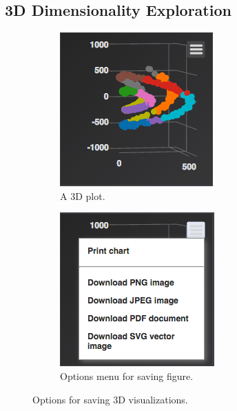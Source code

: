 \documentclass{sigchi}
\begin{document}
\subsection{3D Dimensionality Exploration}%
%
%
\begin{figure}
\centering
\begin{subfigure}{.49\columnwidth}
  \centering
  \includegraphics[width=.95\columnwidth]{figures/preclick3d}
  \caption{A 3D plot.}
\end{subfigure}%
\begin{subfigure}{.49\columnwidth}
  \centering
  \includegraphics[width=.96\columnwidth]{figures/postclick3d}
  \caption{Options menu for saving figure.}
\end{subfigure}
\caption{Options for saving 3D visualizations.}
\label{fig:double}
\end{figure}%
\end{document}
